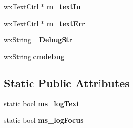 \begin{DoxyCompactItemize}
\item 
\hypertarget{class_my_frame_aba7629d74fabbfc2ee42caab01242ac5}{wx\+Text\+Ctrl $\ast$ {\bfseries m\+\_\+text\+In}}\label{class_my_frame_aba7629d74fabbfc2ee42caab01242ac5}

\item 
\hypertarget{class_my_frame_a8bed6a6ae541fdfdf52fde0e8c21abb3}{wx\+Text\+Ctrl $\ast$ {\bfseries m\+\_\+text\+Err}}\label{class_my_frame_a8bed6a6ae541fdfdf52fde0e8c21abb3}

\item 
\hypertarget{class_my_frame_aa022cd1b61ebb9a6aefb431f00c08f3f}{wx\+String {\bfseries \+\_\+\+Debug\+Str}}\label{class_my_frame_aa022cd1b61ebb9a6aefb431f00c08f3f}

\item 
\hypertarget{class_my_frame_ab118c814a6c0821cee40672fc52f1e29}{wx\+String {\bfseries cmdebug}}\label{class_my_frame_ab118c814a6c0821cee40672fc52f1e29}

\end{DoxyCompactItemize}
\subsection*{Static Public Attributes}
\begin{DoxyCompactItemize}
\item 
\hypertarget{class_my_frame_a6db4ee6efadd827b26b2c2cef819ee8b}{static bool {\bfseries ms\+\_\+log\+Text}}\label{class_my_frame_a6db4ee6efadd827b26b2c2cef819ee8b}

\item 
\hypertarget{class_my_frame_a6f0f6aa2427dac4e05ab0999991e19fc}{static bool {\bfseries ms\+\_\+log\+Focus}}\label{class_my_frame_a6f0f6aa2427dac4e05ab0999991e19fc}

\end{DoxyCompactItemize}
